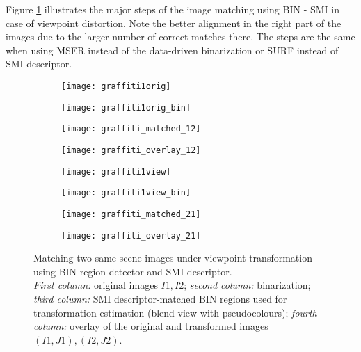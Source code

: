 \documentclass[a4paper,11pt]{article}
\begin{document}
Figure \ref{fig:matching1} illustrates the major steps of the image matching using BIN - SMI in case of viewpoint distortion. Note the better alignment in the right part of the images due to the larger number of correct matches there. The steps are the same when using MSER instead of the data-driven binarization or SURF instead of SMI descriptor. %

\begin{figure}[h]
 \vspace{-10pt} 
\begin{center}
\begin{subfigure}[b]{0.22\textwidth}
  \texttt{[image: graffiti1orig]}
\end{subfigure}
\begin{subfigure}[b]{0.22\textwidth}
\texttt{[image: graffiti1orig\_bin]}
\end{subfigure}
\begin{subfigure}[b]{0.22\textwidth}
  \texttt{[image: graffiti\_matched\_12]}
\end{subfigure}
\begin{subfigure}[b]{0.22\textwidth}
\texttt{[image: graffiti\_overlay\_12]}
\end{subfigure}
\end{center}
\vspace{-22pt}
\begin{center}
\begin{subfigure}[b]{0.22\textwidth}
  \texttt{[image: graffiti1view]}
\end{subfigure}
\begin{subfigure}[b]{0.22\textwidth}
\texttt{[image: graffiti1view\_bin]}
\end{subfigure}
\begin{subfigure}[b]{0.22\textwidth}
  \texttt{[image: graffiti\_matched\_21]}
\end{subfigure}
\begin{subfigure}[b]{0.22\textwidth}
\texttt{[image: graffiti\_overlay\_21]}
\end{subfigure}
\end{center}
\vspace{-20pt}
\caption{\footnotesize Matching two same scene images under viewpoint transformation using BIN region detector and SMI descriptor. \\{\em First column:} original images $I1, I2$; {\em second column:} binarization; {\em third column:} SMI descriptor-matched BIN regions used for transformation estimation (blend view with pseudocolours); {\em fourth column:} overlay of the original and transformed images $(I1, J1), (I2, J2)$. }
\label{fig:matching1}
  \vspace{-12pt}
\end{figure}
\end{document}
